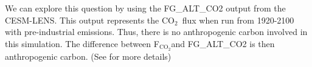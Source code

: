 \documentclass[12pt]{article}
\newcommand{\FCO}{F$_{\mathrm{CO}_{2}}$}
\newcommand{\CO}{CO$_{2}$}
\begin{document}
We can explore this question by using the FG\_ALT\_CO2 output from the CESM-LENS. This output represents the \CO~flux when run from 1920-2100 with pre-industrial emissions. Thus, there is no anthropogenic carbon involved in this simulation. The difference between \FCO and FG\_ALT\_CO2 is then anthropogenic carbon. (See \citep{lovenduski_enhanced_2007} for more details)



\clearpage

\clearpage

\end{document}

